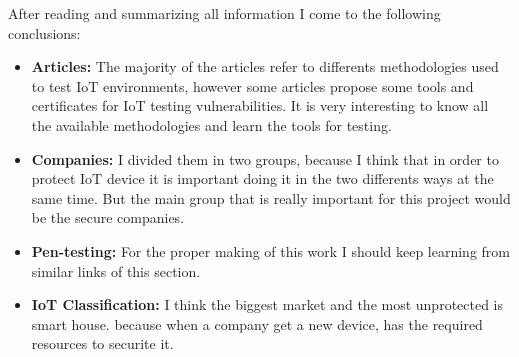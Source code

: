 
After reading and summarizing all information I come to the following conclusions:

\begin{itemize}
	\item \textbf{Articles:} The majority of the articles refer to differents methodologies used to test IoT environments, however some articles propose some tools and certificates for IoT testing vulnerabilities. It is very interesting to know all the available methodologies and learn the tools for testing.
	
	\item \textbf{Companies:} I divided them in two groups, because I think that in order to protect IoT device it is important doing it in the two differents ways at the same time. But the main group that is really important for this project would be the secure companies.

	\item \textbf{Pen-testing:} For the proper making of this work I should keep learning from similar links of this section.
	
	\item \textbf{IoT Classification:} I think the biggest market and the most unprotected is smart house. because when a company get a new device, has the required resources to securite it.
\end{itemize}